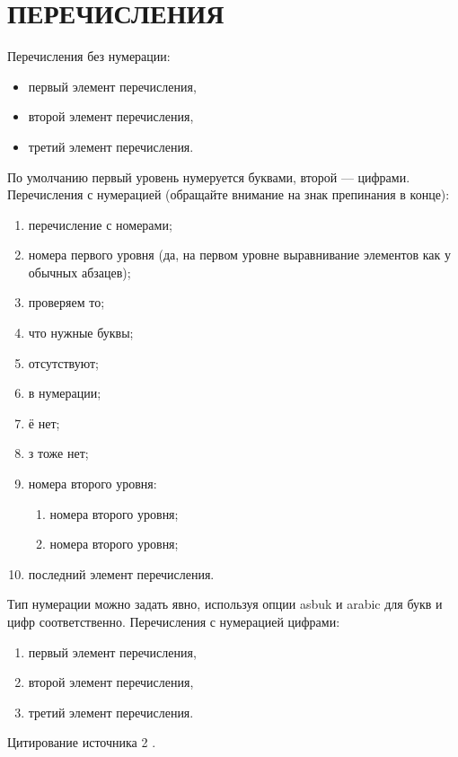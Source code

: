 \section{ПЕРЕЧИСЛЕНИЯ}

Перечисления без нумерации:

\begin{itemize}
    \item первый элемент перечисления,
    \item второй элемент перечисления,
    \item третий элемент перечисления.
\end{itemize}

По умолчанию первый уровень нумеруется буквами, второй --- цифрами.
Перечисления с нумерацией (обращайте внимание на знак препинания в конце):

\begin{enumerate}
    \item перечисление с номерами;
    \item номера первого уровня
    (да, на первом уровне выравнивание элементов как у обычных абзацев);
    \item проверяем то;
    \item что нужные буквы;
    \item отсутствуют;
    \item в нумерации;
    \item ё нет;
    \item з тоже нет;
    \item номера второго уровня:
        \begin{enumerate}
            \item номера второго уровня;
            \item номера второго уровня;
        \end{enumerate}
    \item последний элемент перечисления.
\end{enumerate}

Тип нумерации можно задать явно, используя опции asbuk и arabic для букв и цифр соответственно. Перечисления с нумерацией цифрами:

\begin{enumerate}[arabic]
    \item первый элемент перечисления,
    \item второй элемент перечисления,
    \item третий элемент перечисления.
\end{enumerate}

Цитирование источника 2 \cite{Article3}.
